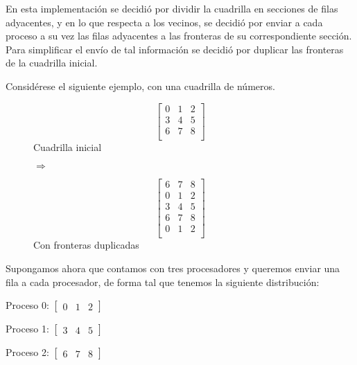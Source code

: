 \documentclass[a4paper,12pt]{article}
\begin{document}
En esta implementación se decidió por dividir la cuadrilla en secciones de filas adyacentes, y en lo que respecta a los vecinos, se decidió por enviar a cada proceso a su vez las filas adyacentes a las fronteras de su correspondiente sección. Para simplificar el envío de tal información se decidió por duplicar las fronteras de la cuadrilla inicial.

Considérese el siguiente ejemplo, con una cuadrilla de números.

\begin{figure}[H]
    \begin{minipage}{.5\linewidth}
        \centering
        \[
            \begin{bmatrix}
                0 & 1 & 2 \\
                3 & 4 & 5 \\
                6 & 7 & 8 \\
            \end{bmatrix}
        \]
        Cuadrilla inicial
    \end{minipage}
    $\Rightarrow$
    \begin{minipage}{.5\linewidth}
        \centering
        \[
            \begin{bmatrix}
                6 & 7 & 8 \\
                0 & 1 & 2 \\
                3 & 4 & 5 \\
                6 & 7 & 8 \\
                0 & 1 & 2 \\
            \end{bmatrix}
        \]
        Con fronteras duplicadas
    \end{minipage}%
\end{figure}

Supongamos ahora que contamos con tres procesadores y queremos enviar una fila a cada procesador, de forma tal que tenemos la siguiente distribución:

\begin{description}
    \item Proceso 0: $\begin{bmatrix} 0 & 1 & 2 \end{bmatrix}$
    \item Proceso 1: $\begin{bmatrix} 3 & 4 & 5 \end{bmatrix}$
    \item Proceso 2: $\begin{bmatrix} 6 & 7 & 8 \end{bmatrix}$
\end{description}
\end{document}
